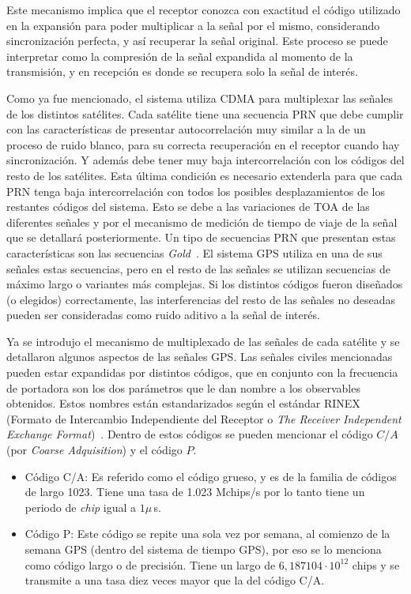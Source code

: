 \documentclass[a4paper,12pt,oneside,onecolumn,final,openright]{book}%
\begin{document}
	Este mecanismo implica que el receptor conozca con exactitud el código utilizado en la expansión para poder multiplicar a la señal por el mismo, considerando sincronización perfecta, y así recuperar la señal original. Este proceso se puede interpretar como la compresión de la señal expandida al momento de la transmisión, y en recepción es donde se recupera solo la señal de interés.
	
	Como ya fue mencionado, el sistema utiliza CDMA para multiplexar las señales de los distintos satélites. Cada satélite tiene una secuencia PRN que debe cumplir con las características de presentar autocorrelación muy similar a la de un proceso de ruido blanco, para su correcta recuperación en el receptor cuando hay sincronización. Y además debe tener muy baja intercorrelación con los códigos del resto de los satélites. Esta última condición es necesario extenderla para que cada PRN tenga baja intercorrelación con todos los posibles desplazamientos de los restantes códigos del sistema. Esto se debe a las variaciones de TOA de las diferentes señales y por el mecanismo de medición de tiempo de viaje de la señal que se detallará posteriormente. Un tipo de secuencias PRN que presentan estas características son las secuencias \textit{Gold}~\cite{proakis}. El sistema GPS utiliza en una de sus señales estas secuencias, pero en el resto de las señales se utilizan secuencias de máximo largo o variantes más complejas. Si los distintos códigos fueron diseñados (o elegidos) correctamente, las interferencias del resto de las señales no deseadas pueden ser consideradas como ruido aditivo a la señal de interés.
	
	Ya se introdujo el mecanismo de multiplexado de las señales de cada satélite y se detallaron algunos aspectos de las señales GPS. Las señales civiles mencionadas pueden estar expandidas por distintos códigos, que en conjunto con la frecuencia de portadora son los dos parámetros que le dan nombre a los observables obtenidos. Estos nombres están estandarizados según el estándar RINEX (Formato de Intercambio Independiente del Receptor o \textit{The Receiver Independent Exchange Format})~\cite{rinex}. Dentro de estos códigos se pueden mencionar el código $C/A$ (por \textit{Coarse Adquisition}) y el código $P$.
\begin{itemize}
	\item Código C/A: Es referido como el código grueso, y es de la familia de códigos de largo 1023. Tiene una tasa de 1.023 Mchips/s por lo tanto tiene un periodo de \textit{chip} igual a $1\mu$\,s.
	\item Código P: Este código se repite una sola vez por semana, al comienzo de la semana GPS (dentro del sistema de tiempo GPS), por eso se lo menciona como código largo o de precisión. Tiene un largo de $6,187104\cdot 10^{12}$ chips y se transmite a una tasa diez veces mayor que la del código C/A.
\end{itemize}
\end{document}
